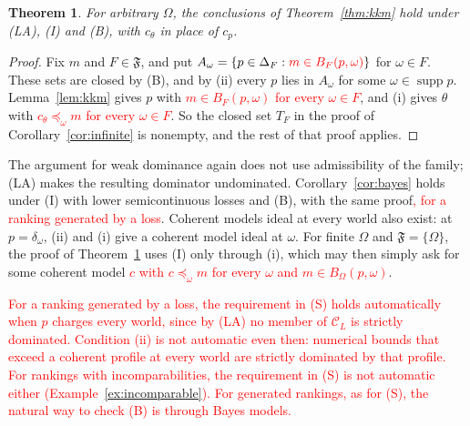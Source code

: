 \documentclass[11pt]{article}
\newtheorem{theorem}{Theorem}[section]
\theoremstyle{definition}
\theoremstyle{remark}
\newcommand{\C}{\mathcal C}
\newcommand{\F}{\mathfrak F}
\newcommand{\supp}{\operatorname{supp}}
\begin{document}
\begin{theorem}\label{thm:bounds}
For arbitrary $\Omega$, the conclusions of Theorem~\ref{thm:kkm} hold under (LA), (I) and (B), with $c_\theta$ in place of $c_p$.
\end{theorem}
\begin{proof}
Fix $m$ and $F\in\F$, and put $A_\omega=\{p\in\Delta_F:\textcolor{red}{m\in B_F(p,\omega)}\}$ for $\omega\in F$. These sets are closed by (B), and by (ii) every $p$ lies in $A_\omega$ for some $\omega\in\supp p$. Lemma~\ref{lem:kkm} gives $p$ with \textcolor{red}{$m\in B_F(p,\omega)$ for every $\omega\in F$}, and (i) gives $\theta$ with \textcolor{red}{$c_\theta\preceq_\omega m$ for every $\omega\in F$}. So the closed set $T_F$ in the proof of Corollary~\ref{cor:infinite} is nonempty, and the rest of that proof applies.
\end{proof}
The argument for weak dominance again does not use admissibility of the family; (LA) makes the resulting dominator undominated. Corollary~\ref{cor:bayes} holds under (I) with lower semicontinuous losses and (B), with the same proof\textcolor{red}{, for a ranking generated by a loss}. Coherent models ideal at every world also exist: at $p=\delta_\omega$, (ii) and (i) give a coherent model ideal at $\omega$. For finite $\Omega$ and $\F=\{\Omega\}$, the proof of Theorem~\ref{thm:bounds} uses (I) only through (i), which may then simply ask for some coherent model \textcolor{red}{$c$ with $c\preceq_\omega m$ for every $\omega$ and $m\in B_\Omega(p,\omega)$}.

\textcolor{red}{For a ranking generated by a loss, the requirement in (S) holds automatically when $p$ charges every world, since by (LA) no member of $\C_L$ is strictly dominated. Condition (ii) is not automatic even then: numerical bounds that exceed a coherent profile at every world are strictly dominated by that profile. For rankings with incomparabilities, the requirement in (S) is not automatic either (Example~\ref{ex:incomparable}). For generated rankings, as for (S), the natural way to check (B) is through Bayes models.}
\end{document}
